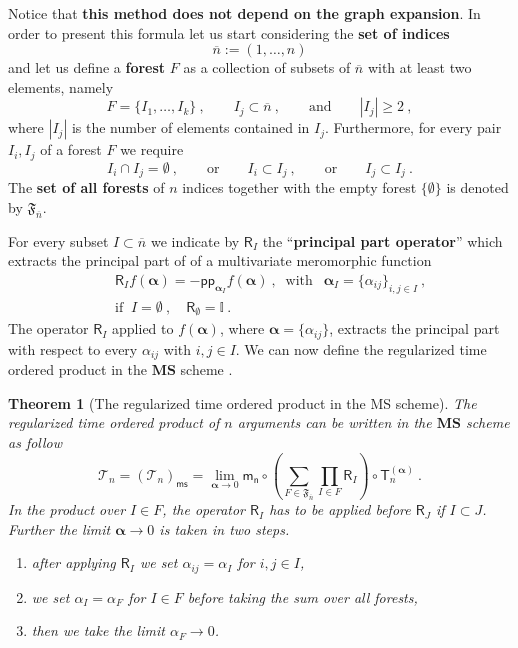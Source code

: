 \documentclass[11pt]{book}
\newcommand{\pp}{\mathsf{pp}}
\newcommand{\ms}{\mathsf{ms}}
\newcommand{\MS}{\textbf{MS}}
\newcommand{\alphabd}{\boldsymbol{\alpha}}
\newcommand{\abs}[1]{\left|#1\right|}
\newcommand{\Tcal}{\mathcal{T}}
\newcommand{\Ibb}{\mathbb{I}}
\newcommand{\Frak}{\mathfrak{F}}
\newcommand{\Rsf}{\mathsf{R}}
\newcommand{\Tsf}{\mathsf{T}}
\newcommand{\msf}{\mathsf{m}}
\newcommand{\nsf}{\mathsf{n}}
\theoremstyle{break}
\newtheorem{theorem}{Theorem}[chapter]
\begin{document}
Notice that \textbf{this method does not depend on the graph expansion}. In order to present this formula let us start considering the \textbf{set of indices}
%
\begin{equation*}
\overline{n} := (1,\dots , n)
\end{equation*}
%
and let us define a \textbf{forest} $F$ as a collection of subsets of $\overline{n}$ with at least two elements, namely 
%
\begin{equation*}
F = \{ I_1,\dots, I_k\} \ , \qquad I_j \subset \overline{n} \ , \qquad \mbox{and} \qquad \abs{I_j} \geq 2 \ ,
\end{equation*}
%
where $\abs{I_j}$ is the number of elements contained in $I_j$. Furthermore, for every pair $I_i,I_j$ of a forest $F$ we require
%
\begin{equation*}
I_i\cap I_j = \emptyset \ , \qquad \text{or} \qquad I_i \subset I_j \ , \qquad \mbox{or} \qquad  I_j\subset I_j \ .
\end{equation*}
%
The \textbf{set of all forests} of $n$ indices together with the empty forest $\{\emptyset\}$ is denoted by $\mathfrak{F}_{\overline{n}}$.


For every subset $I\subset \overline{n}$ we indicate by $\Rsf_I$\index{$\Rsf_I $} the ``\textbf{principal part operator}'' which extracts the principal part of of a multivariate meromorphic function
%
\begin{eqnarray}
&& \Rsf_I f(\alphabd) = - \pp_{\alphabd_I} f(\alphabd) \ , \ \mbox{ with } \ \ \alphabd_I = \{\alpha_{ij}\}_{i,j \in I} \ , \\
\label{eq:pp_op}
&& \mbox{if } \ I=\emptyset \ , \quad \Rsf_\emptyset = \Ibb \ . \nonumber
\end{eqnarray}
%
The operator $\Rsf_I$ applied to $f(\alphabd)$, where $\alphabd = \{\alpha_{ij}\}$, extracts the principal part with respect to every $\alpha_{ij}$ with $i,j\in I$. We can now define the regularized time ordered product in the $\MS$ scheme \cite{duetsch_dimensional_2014}.


\begin{theorem}[The regularized time ordered product in the MS scheme] \label{theo:renorm_t_prod_ms_forest}
The regularized time ordered product of $n$ arguments can be written in the $\MS$ scheme as follow
%
\begin{equation}
\Tcal_n = \left(\Tcal_n\right)_\ms = \lim_{\alphabd \to 0} \msf_\nsf \circ \left( \sum_{F\in\Frak_{\overline{n}}} \prod_{I\in F} \Rsf_I \right) \circ \Tsf^{(\alphabd)}_n \ .
\label{eq:ms_t_forest}
\end{equation}
%
In the product over $I\in F$, the operator $\Rsf_I$ has to be applied before $\Rsf_J$ if $I\subset J$. Further the limit $\alphabd \to 0$ is taken in two steps. 
%
\begin{enumerate}
\item after applying $\Rsf_I$ we set $\alpha_{ij}=\alpha_I$ for $i,j\in I$,
%
\item we set $\alpha_{I} = \alpha_F$ for $I \in F$ before taking the sum over all forests,
%
\item then we take the limit $\alpha_F \to 0$.
\end{enumerate}
%
%
\end{theorem}
\end{document}
